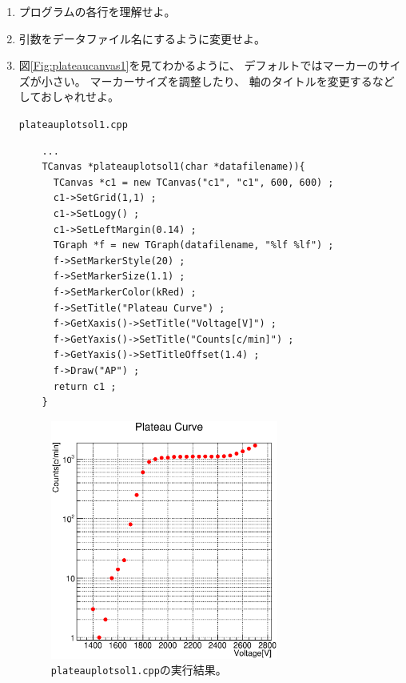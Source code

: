   \begin{enumerate}
    \item プログラムの各行を理解せよ。
    \item 引数をデータファイル名にするように変更せよ。
    \item 図\ref{Fig:plateaucanvas1}を見てわかるように、
	  デフォルトではマーカーのサイズが小さい。
	  マーカーサイズを調整したり、
	  軸のタイトルを変更するなどしておしゃれせよ。
	  \begin{itembox}{\texttt{plateauplotsol1.cpp}}
\begin{verbatim}
	...
	TCanvas *plateauplotsol1(char *datafilename)){
	  TCanvas *c1 = new TCanvas("c1", "c1", 600, 600) ;
	  c1->SetGrid(1,1) ;
	  c1->SetLogy() ;
	  c1->SetLeftMargin(0.14) ;
	  TGraph *f = new TGraph(datafilename, "%lf %lf") ;
	  f->SetMarkerStyle(20) ;
	  f->SetMarkerSize(1.1) ;
	  f->SetMarkerColor(kRed) ;
	  f->SetTitle("Plateau Curve") ;
	  f->GetXaxis()->SetTitle("Voltage[V]") ;
	  f->GetYaxis()->SetTitle("Counts[c/min]") ;
	  f->GetYaxis()->SetTitleOffset(1.4) ;
	  f->Draw("AP") ;
	  return c1 ;
	}
\end{verbatim}
	  \end{itembox}
	  \begin{figure}[htbp]
	   \begin{center}
	    \includegraphics[width = 75mm]{./picture/plateaucanvas2.eps}
	   \end{center}
	   \caption{\texttt{plateauplotsol1.cpp}の実行結果。}
	   \label{Fig:plateaucanvas2}
	  \end{figure}
   \end{enumerate}






